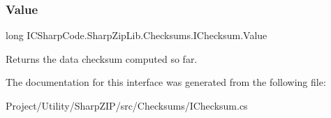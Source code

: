 \subsubsection{\texorpdfstring{Value}{Value}}
{\footnotesize\ttfamily long I\+C\+Sharp\+Code.\+Sharp\+Zip\+Lib.\+Checksums.\+I\+Checksum.\+Value\hspace{0.3cm}{\ttfamily [get]}}



Returns the data checksum computed so far. 



The documentation for this interface was generated from the following file\+:\begin{DoxyCompactItemize}
\item 
Project/\+Utility/\+Sharp\+Z\+I\+P/src/\+Checksums/I\+Checksum.\+cs\end{DoxyCompactItemize}
